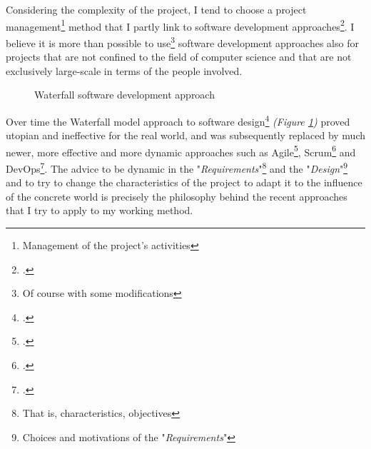 \documentclass[a4paper, 10pt, final]{article} %
\newcommand{\InvisibleBorder}{
    (current bounding box.south west) ++($(-\fboxsep, -\fboxsep)-(0.5,0.5)$) coordinate (ll)
    (current bounding box.north east) ++($(\fboxsep, \fboxsep)+(0.5,0.5)$) coordinate (ur)
}
\begin{document}
    Considering the complexity of the project, I tend to choose a project management\footnote{Management of the project's activities} method that I partly link to software development approaches\footcite[]{SoftwareDevelopmentProcess:Wiki}.
    I believe it is more than possible to use\footnote{Of course with some modifications} software development approaches also for projects that are not confined to the field of computer science and that are not exclusively large-scale in terms of the people involved.
    \begin{figure}[H]
        \centering
        \caption{Waterfall software development approach}
        \label{fig:Waterfall}
    \end{figure}
    Over time the Waterfall model approach to software design\footcite[]{WaterfallModel:Wiki} \emph{(Figure \ref{fig:Waterfall})} proved utopian and ineffective for the real world, and was subsequently replaced by much newer, more effective and more dynamic approaches such as Agile\footcite[]{AgileModel:Wiki}, Scrum\footcite[]{ScrumModel:Wiki} and DevOps\footcite[]{DevOpsModel:Wiki}.
    The advice to be dynamic in the "\emph{Requirements}"\footnote{That is, characteristics, objectives} and the "\emph{Design}"\footnote{Choices and motivations of the "\emph{Requirements}"} and to try to change the characteristics of the project to adapt it to the influence of the concrete world is precisely the philosophy behind the recent approaches that I try to apply to my working method.
\end{document}
